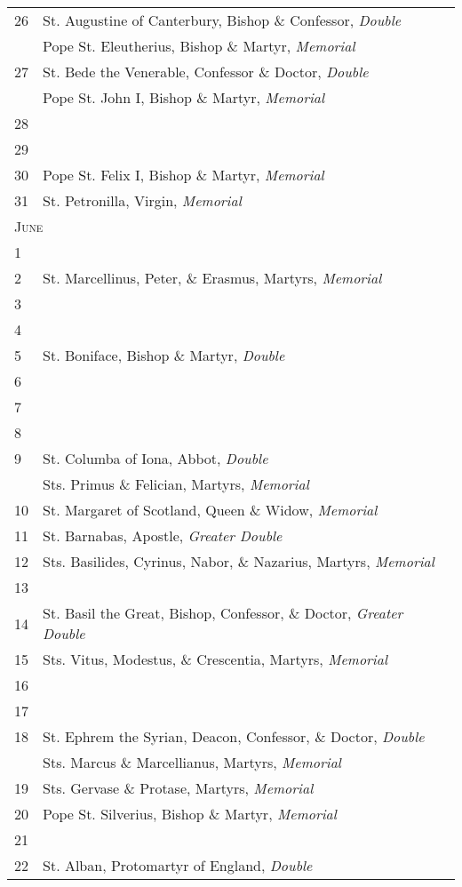 \begin{longtable}{p{2mm}|p{94mm}}
26&St. Augustine of Canterbury, Bishop \& Confessor, \textit{Double}\\
&Pope St. Eleutherius, Bishop \& Martyr, \textit{Memorial}\\
27&St. Bede the Venerable, Confessor \& Doctor, \textit{Double}\\
&Pope St. John I, Bishop \& Martyr, \textit{Memorial}\\
28&\\
29&\\
30&Pope St. Felix I, Bishop \& Martyr, \textit{Memorial}\\
31&St. Petronilla, Virgin, \textit{Memorial}\\
\multicolumn{2}{l}{\textsc{June}}\\
1&\\
2&St. Marcellinus, Peter, \& Erasmus, Martyrs, \textit{Memorial}\\
3&\\
4&\\
5&St. Boniface, Bishop \& Martyr, \textit{Double}\\
6&\\
7&\\
8&\\
9&St. Columba of Iona, Abbot, \textit{Double}\\
&Sts. Primus \& Felician, Martyrs, \textit{Memorial}\\
10&St. Margaret of Scotland, Queen \& Widow, \textit{Memorial}\\
11&{\color{RubricRed}St. Barnabas, Apostle}, \textit{Greater Double}\\
12&Sts. Basilides, Cyrinus, Nabor, \& Nazarius, Martyrs, \textit{Memorial}\\
13&\\
14&St. Basil the Great, Bishop, Confessor, \& Doctor, \textit{Greater Double}\\
15&Sts. Vitus, Modestus, \& Crescentia, Martyrs, \textit{Memorial}\\
16&\\
17&\\
18&St. Ephrem the Syrian, Deacon, Confessor, \& Doctor, \textit{Double}\\
&Sts. Marcus \& Marcellianus, Martyrs, \textit{Memorial}\\
19&Sts. Gervase \& Protase, Martyrs, \textit{Memorial}\\
20&Pope St. Silverius, Bishop \& Martyr, \textit{Memorial}\\
21&\\
22&St. Alban, Protomartyr of England, \textit{Double}\\

\end{longtable}
